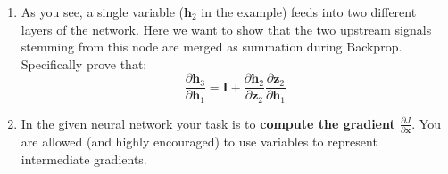 \begin{enumerate}
    \item As you see, a single variable ($\mathbf{h}_2$ in the example) feeds into two different layers of the network. Here we want to show that the two upstream signals stemming from this node are merged as summation  during Backprop. Specifically prove that: 
    $$
    \frac{\partial \mathbf{h}_3}{\partial \mathbf{h}_1 } = \textbf{I} + \frac{\partial \mathbf{h}_2}{\partial \mathbf{z}_2 } \frac{\partial \mathbf{z}_2}{\partial \mathbf{h}_1 } 
    $$



    \item 
    In the given neural network your task is to \textbf{compute the gradient 
    $\frac{\partial J}{ \partial \mathbf{x}}.$}    
    You are allowed (and highly encouraged) to use variables to represent intermediate gradients. 
    

\end{enumerate}
